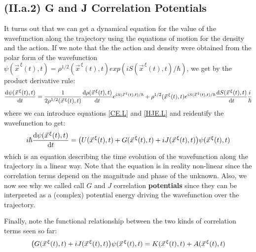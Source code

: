 \documentclass[11pt, a4paper]{article} %
\begin{document}
\subsection*{(II.a.2) G and J Correlation Potentials}
It turns out that we can get a dynamical equation for the value of the wavefunction along the trajectory using the equations of motion for the density and the action. If we note that the the action and density were obtained from the polar form of the wavefunction $\psi(\vec{x}^{\, \xi}(t),t)=\rho^{1/2}(\vec{x}^{\, \xi}(t),t)exp(iS(\vec{x}^{\, \xi}(t),t)/\hbar)$, we get by the product derivative rule:
\begin{equation}
\dv{\psi(\vec{x}^{\, \xi}(t),t)}{t}=\frac{1}{2\rho^{1/2}(\vec{x}^{\, \xi}(t),t)}\dv{\rho(\vec{x}^{\, \xi}(t),t)}{t}e^{iS(\vec{x}^{\, \xi}(t),t)/\hbar}+\rho^{1/2}(\vec{x}^{\, \xi}(t),t)e^{iS(\vec{x}^{\, \xi}(t),t)/\hbar}\dv{S(\vec{x}^{\, \xi}(t),t)}{t}\frac{i}{\hbar}
\end{equation}
where we can introduce equations \eqref{CE.L} and \eqref{HJE.L} and reidentify the wavefunction to get:
\begin{equation}
i\hbar \dv{\psi(\vec{x}^{\, \xi}(t),t)}{t}=\qty(U(\vec{x}^{\, \xi}(t),t)+G(\vec{x}^{\, \xi}(t),t)+iJ(\vec{x}^{\, \xi}(t),t))\psi(\vec{x}^{\, \xi}(t),t)
\end{equation}
which is an equation describing the time evolution of the wavefunction along the trajectory in a linear way. Note that the equation is in reality non-linear since the correlation terms depend on the magnitude and phase of the unknown. Also, we now see why we called call $G$ and $J$ correlation {\bf potentials} since they can be interpreted as a (complex) potential energy driving the wavefunction over the trajectory.

Finally, note the functional relationship between the two kinds of correlation terms seen so far:
\begin{equation}
\qty(G(\vec{x}^{\, \xi}(t),t)+iJ(\vec{x}^{\, \xi}(t),t))\psi(\vec{x}^{\, \xi}(t),t)=K(\vec{x}^{\, \xi}(t),t)+A(\vec{x}^{\, \xi}(t),t)
\end{equation}
\end{document}
